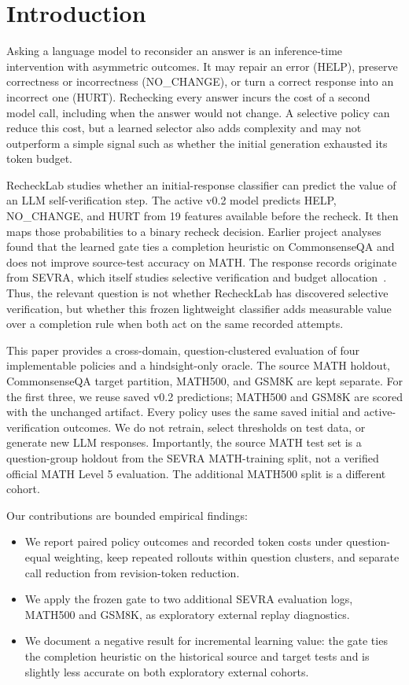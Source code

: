 \documentclass[conference]{IEEEtran}
\begin{document}
\section{Introduction}
Asking a language model to reconsider an answer is an inference-time intervention with asymmetric outcomes. It may repair an error (HELP), preserve correctness or incorrectness (NO\_CHANGE), or turn a correct response into an incorrect one (HURT). Rechecking every answer incurs the cost of a second model call, including when the answer would not change. A selective policy can reduce this cost, but a learned selector also adds complexity and may not outperform a simple signal such as whether the initial generation exhausted its token budget.

RecheckLab studies whether an initial-response classifier can predict the value of an LLM self-verification step. The active v0.2 model predicts HELP, NO\_CHANGE, and HURT from 19 features available before the recheck. It then maps those probabilities to a binary recheck decision. Earlier project analyses found that the learned gate ties a completion heuristic on CommonsenseQA and does not improve source-test accuracy on MATH. The response records originate from SEVRA, which itself studies selective verification and budget allocation~\cite{dip2026sevra}. Thus, the relevant question is not whether RecheckLab has discovered selective verification, but whether this frozen lightweight classifier adds measurable value over a completion rule when both act on the same recorded attempts.

This paper provides a cross-domain, question-clustered evaluation of four implementable policies and a hindsight-only oracle. The source MATH holdout, CommonsenseQA target partition, MATH500, and GSM8K are kept separate. For the first three, we reuse saved v0.2 predictions; MATH500 and GSM8K are scored with the unchanged artifact. Every policy uses the same saved initial and active-verification outcomes. We do not retrain, select thresholds on test data, or generate new LLM responses. Importantly, the source MATH test set is a question-group holdout from the SEVRA MATH-training split, not a verified official MATH Level 5 evaluation. The additional MATH500 split is a different cohort.

Our contributions are bounded empirical findings:
\begin{itemize}
  \item We report paired policy outcomes and recorded token costs under question-equal weighting, keep repeated rollouts within question clusters, and separate call reduction from revision-token reduction.
  \item We apply the frozen gate to two additional SEVRA evaluation logs, MATH500 and GSM8K, as exploratory external replay diagnostics.
  \item We document a negative result for incremental learning value: the gate ties the completion heuristic on the historical source and target tests and is slightly less accurate on both exploratory external cohorts.
\end{itemize}
\end{document}
